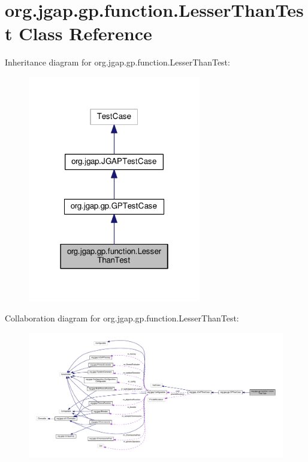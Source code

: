 \hypertarget{classorg_1_1jgap_1_1gp_1_1function_1_1_lesser_than_test}{\section{org.\-jgap.\-gp.\-function.\-Lesser\-Than\-Test Class Reference}
\label{classorg_1_1jgap_1_1gp_1_1function_1_1_lesser_than_test}
}


Inheritance diagram for org.\-jgap.\-gp.\-function.\-Lesser\-Than\-Test\-:
\nopagebreak
\begin{figure}[H]
\begin{center}
\leavevmode
\includegraphics[width=214pt]{classorg_1_1jgap_1_1gp_1_1function_1_1_lesser_than_test__inherit__graph}
\end{center}
\end{figure}


Collaboration diagram for org.\-jgap.\-gp.\-function.\-Lesser\-Than\-Test\-:
\nopagebreak
\begin{figure}[H]
\begin{center}
\leavevmode
\includegraphics[width=350pt]{classorg_1_1jgap_1_1gp_1_1function_1_1_lesser_than_test__coll__graph}
\end{center}
\end{figure}
